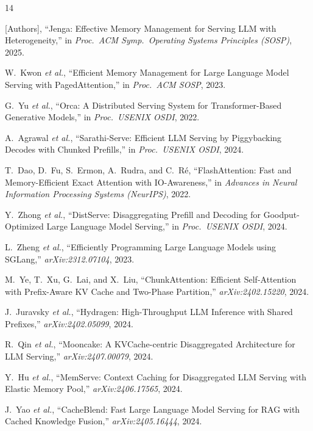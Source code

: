 \documentclass[journal]{IEEEtran}
\begin{document}
\begin{thebibliography}{14}

[Authors],
``Jenga: Effective Memory Management for Serving LLM with Heterogeneity,''
in \emph{Proc.\ ACM Symp.\ Operating Systems Principles (SOSP)}, 2025.

W.~Kwon \emph{et al.},
``Efficient Memory Management for Large Language Model Serving with
PagedAttention,''
in \emph{Proc.\ ACM SOSP}, 2023.

G.~Yu \emph{et al.},
``Orca: A Distributed Serving System for Transformer-Based Generative Models,''
in \emph{Proc.\ USENIX OSDI}, 2022.

A.~Agrawal \emph{et al.},
``Sarathi-Serve: Efficient LLM Serving by Piggybacking Decodes with Chunked
Prefills,''
in \emph{Proc.\ USENIX OSDI}, 2024.

T.~Dao, D.~Fu, S.~Ermon, A.~Rudra, and C.~R{\'e},
``FlashAttention: Fast and Memory-Efficient Exact Attention with IO-Awareness,''
in \emph{Advances in Neural Information Processing Systems (NeurIPS)}, 2022.

Y.~Zhong \emph{et al.},
``DistServe: Disaggregating Prefill and Decoding for Goodput-Optimized Large
Language Model Serving,''
in \emph{Proc.\ USENIX OSDI}, 2024.

L.~Zheng \emph{et al.},
``Efficiently Programming Large Language Models using SGLang,''
\emph{arXiv:2312.07104}, 2023.

M.~Ye, T.~Xu, G.~Lai, and X.~Liu,
``ChunkAttention: Efficient Self-Attention with Prefix-Aware KV Cache and
Two-Phase Partition,''
\emph{arXiv:2402.15220}, 2024.

J.~Juravsky \emph{et al.},
``Hydragen: High-Throughput LLM Inference with Shared Prefixes,''
\emph{arXiv:2402.05099}, 2024.

R.~Qin \emph{et al.},
``Mooncake: A KVCache-centric Disaggregated Architecture for LLM Serving,''
\emph{arXiv:2407.00079}, 2024.

Y.~Hu \emph{et al.},
``MemServe: Context Caching for Disaggregated LLM Serving with Elastic Memory
Pool,''
\emph{arXiv:2406.17565}, 2024.

J.~Yao \emph{et al.},
``CacheBlend: Fast Large Language Model Serving for RAG with Cached Knowledge
Fusion,''
\emph{arXiv:2405.16444}, 2024.


\end{thebibliography}
\end{document}
